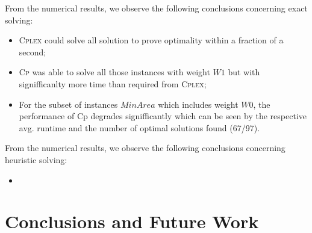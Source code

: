 \documentclass[runningheads,a4paper]{elsarticle}
\begin{document}
        From the numerical results, we observe the following conclusions concerning exact solving:
        \begin{itemize}
        	\item  \textsc{Cplex} could solve all solution to prove optimality within a fraction of a second;
        	\item   \textsc{Cp} was able to solve all those instances with weight $W1$ but with signifficanlty more time than required from \textsc{Cplex};
        	\item For the subset of instances $MinArea$ which includes weight $W0$, the performance of Cp degrades signifficantly which can be seen  by the respective avg. runtime and the number of optimal solutions found (67/97).
        \end{itemize}
     From the numerical results, we observe the following conclusions concerning heuristic solving:
     \begin{itemize}
     	\item {}
     \end{itemize}
	\section{Conclusions and Future Work}
	
	
	
	
	
	
	
\end{document}
